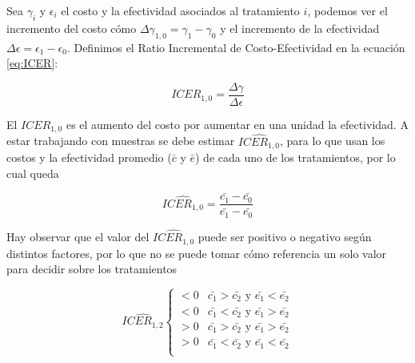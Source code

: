 \documentclass{siep}
\begin{document}
Sea $\gamma_i$ y $\epsilon_i$ el costo y la efectividad asociados al tratamiento $i$, podemos ver el incremento del costo cómo $\Delta\gamma_{1,0}=\gamma_1-\gamma_0$ y el incremento de la efectividad $\Delta\epsilon=\epsilon_1-\epsilon_0$. Definimos el Ratio Incremental de Costo-Efectividad en la ecuación \ref{eq:ICER}:

\begin{equation}
ICER_{1,0}= \frac{\Delta\gamma}{\Delta\epsilon}
\label{eq:ICER}
\end{equation}

El $ICER_{1,0}$ es el aumento del costo por aumentar en una unidad la efectividad. A estar trabajando con muestras se debe estimar   $\widehat{ICER_{1,0}}$,  para lo que usan los costos y la efectividad promedio ($\bar{c}$ y $\bar{e}$) de cada uno de los tratamientos, por lo cual queda

\begin{equation}
\widehat{ICER_{1,0}}= \frac{\bar{c_1}-\bar{c_0}}{\bar{e_1}-\bar{e_0}}
\end{equation}

Hay observar que el valor del $\widehat{ICER_{1,0}}$ puede ser positivo o negativo según distintos factores, por lo que no se puede tomar cómo referencia un solo valor para decidir sobre los tratamientos

\begin{equation}
\widehat{ICER_{1,2}}
\begin{cases}
<0 & \bar{c_1} > \bar{c_2} \text{   y   }   \bar{e_1} < \bar{e_2} \\
<0 & \bar{c_1} < \bar{c_2} \text{   y   }   \bar{e_1} > \bar{e_2} \\
>0 & \bar{c_1} > \bar{c_2} \text{   y   }   \bar{e_1} > \bar{e_2} \\
>0 & \bar{c_1} < \bar{c_2} \text{   y   }   \bar{e_1} < \bar{e_2} \\
\end{cases}
\end{equation}
\end{document}
